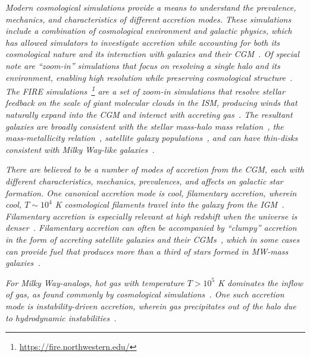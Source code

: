 \documentclass[fleqn,usenatbib]{mnras}
\begin{document}
\textit{
Modern cosmological simulations provide a means to understand the prevalence, mechanics, and characteristics of different accretion modes.
These simulations include a combination of cosmological environment and galactic physics, which has allowed simulators to investigate accretion while accounting for both its cosmological nature and its interaction with galaxies and their CGM~\citep[e.g.][Trapp et al,. in prep.]{Oppenheimer2010, Stewart2011, Fernandez2012, Ford2014, Angles-Alcazar2017, Hafen2019, Hafen2020, Ho2019, Rottgers2020}.
Of special note are ``zoom-in'' simulations that focus on resolving a single halo and its environment, enabling high resolution while preserving cosmological structure~\citep[e.g.][]{Katz1993, Hopkins2014, Hopkins2018, Wang2015, Agertz2020}.
The FIRE simulations~\citep{Hopkins2014, Hopkins2017}\footnote{\url{https://fire.northwestern.edu/}} are a set of zoom-in simulations that resolve stellar feedback on the scale of giant molecular clouds in the ISM, producing winds that naturally expand into the CGM and interact with accreting gas~\citep{Muratov2015,Muratov2016, Hafen2019, Hafen2020}.
The resultant galaxies are broadly consistent with the stellar mass-halo mass relation~\citep{Hopkins2017}, the mass-metallicity relation~\citep{Ma2015}, satellite galaxy populations~\citep{Wetzel2016,Garrison-Kimmel2019a}, and can have thin-disks consistent with Milky Way-like galaxies~\cite{Garrison-Kimmel2018, El-Badry2018}.
}

\textit{
There are believed to be a number of modes of accretion from the CGM, each with different characteristics, mechanics, prevalences, and affects on galactic star formation.
One canonical accretion mode is cool, filamentary accretion, wherein cool, $T \sim 10^4$ K cosmological filaments travel into the galaxy  from the IGM~\cite[e.g.][]{Keres2005, Dekel2006, Keres2009, Martin2019a}.
Filamentary accretion is especially relevant at high redshift when the universe is denser~\citep[e.g.][]{Keres2009a, Stern2019, Huscher2020}.
Filamentary accretion can often be accompanied by ``clumpy'' accretion in the form of accreting satellite galaxies and their CGMs~\citep[e.g.][]{Hafen2019, Hafen2020}, which in some cases can provide fuel that produces more than a third of stars formed in MW-mass galaxies~\citep{Angles-Alcazar2017}.
}

\textit{
For Milky Way-analogs, hot gas with temperature $T>10^5$ K dominates the inflow of gas, as found commonly by cosmological simulations~\citep{Faucher-Giguere2011a, VandeVoort2011, VandeVoort2012a, Joung2012, Murante2012, Nelson2013}.
One such accretion mode is instability-driven accretion, wherein gas precipitates out of the halo due to hydrodynamic instabilities~\citep[e.g.][]{Maller2004, Mccourt2012, Voit2015, Armillotta2016, Gronke2019a, Esmerian2020, Voit2021}.
}
\end{document}
